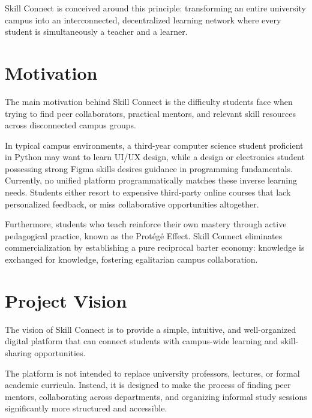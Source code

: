 \documentclass[12pt,a4paper]{report}
\begin{document}
Skill Connect is conceived around this principle: transforming an entire university campus into an interconnected, decentralized learning network where every student is simultaneously a teacher and a learner.

\section{Motivation}
The main motivation behind Skill Connect is the difficulty students face when trying to find peer collaborators, practical mentors, and relevant skill resources across disconnected campus groups.

In typical campus environments, a third-year computer science student proficient in Python may want to learn UI/UX design, while a design or electronics student possessing strong Figma skills desires guidance in programming fundamentals. Currently, no unified platform programmatically matches these inverse learning needs. Students either resort to expensive third-party online courses that lack personalized feedback, or miss collaborative opportunities altogether.

Furthermore, students who teach reinforce their own mastery through active pedagogical practice, known as the Prot\'eg\'e Effect. Skill Connect eliminates commercialization by establishing a pure reciprocal barter economy: knowledge is exchanged for knowledge, fostering egalitarian campus collaboration.

\section{Project Vision}
The vision of Skill Connect is to provide a simple, intuitive, and well-organized digital platform that can connect students with campus-wide learning and skill-sharing opportunities.

The platform is not intended to replace university professors, lectures, or formal academic curricula. Instead, it is designed to make the process of finding peer mentors, collaborating across departments, and organizing informal study sessions significantly more structured and accessible.
\end{document}
